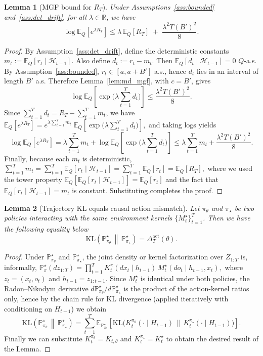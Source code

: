 \documentclass[11pt]{article}
\newtheorem{lemma}{Lemma}
\providecommand{\R}{\mathbb{R}}
\renewcommand{\P}{\mathbb{P}}
\providecommand{\E}{\mathbb{E}}
\begin{document}
\begin{lemma}[MGF bound for $R_T$]\label{lem:mgf-adapted}
Under Assumptions~\ref{ass:bounded} and~\ref{ass:det_drift}, for all $\lambda\in\R$, we have
\[
\log \E_Q\!\left[e^{\lambda R_T}\right]
\le
\lambda\,\E_Q[R_T] \;+\; \frac{\lambda^2 T(B')^2}{8}.
\]
\end{lemma}

\begin{proof}
By Assumption~\ref{ass:det_drift}, define the deterministic constants
$m_t := \E_Q[r_t\mid\mathcal H_{t-1}]$. Also define
\(
d_t := r_t - m_t.
\)
Then $\E_Q[d_t\mid\mathcal H_{t-1}]=0$ $Q$-a.s.
By Assumption~\ref{ass:bounded}, $r_t\in[a,a+B']$ a.s., hence $d_t$ lies in an interval
of length $B'$ a.s. Therefore Lemma~\ref{lem:md_mgf}, with $c = B'$, gives
\[
\log \E_Q\!\left[\exp\!\Big(\lambda\sum_{t=1}^T d_t\Big)\right]
\le
\frac{\lambda^2 T(B')^2}{8}.
\]
Since $\sum_{t=1}^T d_t = R_T - \sum_{t=1}^T m_t$, we have
\(
\E_Q[e^{\lambda R_T}]
= e^{\lambda\sum_{t=1}^T m_t}\;
\E_Q\!\left[\exp\!\Big(\lambda\sum_{t=1}^T d_t\Big)\right],
\)
and taking logs yields
\[
\log \E_Q[e^{\lambda R_T}]
=
\lambda\sum_{t=1}^T m_t
+
\log \E_Q\!\left[\exp\!\Big(\lambda\sum_{t=1}^T d_t\Big)\right]
\le
\lambda\sum_{t=1}^T m_t + \frac{\lambda^2 T(B')^2}{8}.
\]
Finally, because each $m_t$ is deterministic,
\(
\sum_{t=1}^T m_t
= \sum_{t=1}^T \E_Q[r_t\mid\mathcal H_{t-1}]
= \sum_{t=1}^T \E_Q[r_t]
= \E_Q[R_T],
\)
where we used the tower property $\E_Q[\E_Q[r_t\mid\mathcal H_{t-1}]]=\E_Q[r_t]$ and the
fact that $\E_Q[r_t\mid\mathcal H_{t-1}]=m_t$ is constant.
Substituting completes the proof.
\end{proof}


\begin{lemma}[Trajectory KL equals causal action mismatch]
\label{lem:B7-causal-chain-rule}
Let \(\pi_\theta\) and \(\pi_\star\) be two policies interacting with the \emph{same} environment kernels
\(\{M^\star_t\}_{t=1}^T\).
Then we have the following equality below
\[
\mathrm{KL}\!\left(\P^\star_{\pi_\theta}\,\middle\|\,\P^\star_{\pi_\star}\right)
=
\Delta_{T}^{\mathrm{act}}(\theta).
\]
\end{lemma}

\begin{proof}
Under \(\P^\star_{\pi_\theta}\) and \(\P^\star_{\pi_\star}\), the joint density or kernel factorization over \(Z_{1:T}\)
is, informally,
\(
\P^\star_{\pi}(dz_{1:T})
=
\prod_{t=1}^T
K^{\pi}_t(dx_t\mid h_{t-1})\,
M^\star_t(do_t\mid h_{t-1},x_t),
\)
where $z_t=(x_t,o_t)$ and \(h_{t-1}=z_{1:t-1}\).
Since \(M^\star_t\) is identical under both policies, the Radon--Nikodym derivative
\(d\P^\star_{\pi_\theta}/d\P^\star_{\pi_\star}\) is the product of the action-kernel ratios only, hence by the
chain rule for KL divergence (applied iteratively with conditioning on \(H_{t-1}\)) we obtain
\[
\mathrm{KL}\!\left(\P^\star_{\pi_\theta}\,\middle\|\,\P^\star_{\pi_\star}\right)
=
\sum_{t=1}^T
\E_{\P^\star_{\pi_\theta}}\!\left[
\mathrm{KL}\!\Big(
K^{\pi_\theta}_t(\cdot\mid H_{t-1})
\,\Big\|\,
K^{\pi_\star}_t(\cdot\mid H_{t-1})
\Big)\right].
\]
Finally we can substitute \(K^{\pi_\theta}_t=K_{t,\theta}\) and \(K^{\pi_\star}_t=K^\star_t\) to obtain the desired result of the Lemma.
\end{proof}
\end{document}
